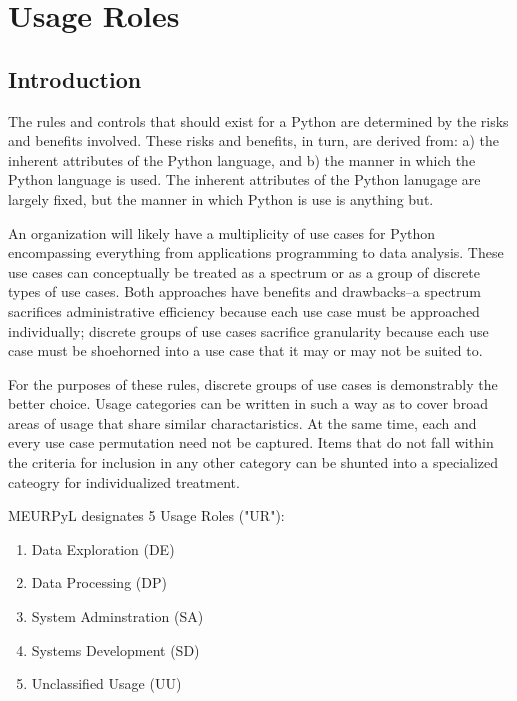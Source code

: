 \section{Usage Roles}

\thispagestyle{section_start_style}

	\subsection*{Introduction}

		The rules and controls that should exist for a Python are determined by the risks and benefits involved. These risks and benefits, in turn, are derived from: a) the inherent attributes of the Python language, and b) the manner in which the Python language is used. The inherent attributes of the Python lanugage are largely fixed, but the manner in which Python is use is anything but.

		An organization will likely have a multiplicity of use cases for Python encompassing everything from applications programming to data analysis. These use cases can conceptually be treated as a spectrum or as a group of discrete types of use cases. Both approaches have benefits and drawbacks--a spectrum sacrifices administrative efficiency because each use case must be approached individually; discrete groups of use cases sacrifice granularity because each use case must be shoehorned into a use case that it may or may not be suited to.

		For the purposes of these rules, discrete groups of use cases is demonstrably the better choice. Usage categories can be written in such a way as to cover broad areas of usage that share similar charactaristics. At the same time, each and every use case permutation need not be captured. Items that do not fall within the criteria for inclusion in any other category can be shunted into a specialized cateogry for individualized treatment.

		MEURPyL designates 5 Usage Roles ("UR"):

		\begin{enumerate}
        	\item Data Exploration (DE)
        	\item Data Processing (DP)
        	\item System Adminstration (SA)
        	\item Systems Development (SD)
        	\item Unclassified Usage (UU)
        \end{enumerate}

